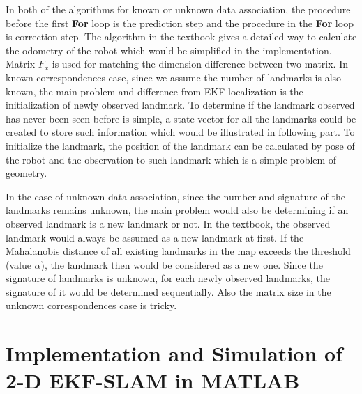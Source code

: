 \documentclass[conference]{IEEEtran}
\begin{document}
\par In both of the algorithms for known or unknown data association, the procedure before the first \textbf{For} loop is the prediction step and the procedure in the \textbf{For} loop is correction step. The algorithm in the textbook gives a detailed way to calculate the odometry of the robot which would be simplified in the implementation. Matrix $F_{x}$ is used for matching the dimension difference between two matrix. In known correspondences case, since we assume the number of landmarks is also known, the main problem and difference from EKF localization is the initialization of newly observed landmark. To determine if the landmark observed has never been seen before is simple, a state vector for all the landmarks could be created to store such information which would be illustrated in following part. To initialize the landmark, the position of the landmark can be calculated by pose of the robot and the observation to such landmark which is a simple problem of geometry.
\par In the case of unknown data association, since the number and signature of the landmarks remains unknown, the main problem would also be determining if an observed landmark is a new landmark or not. In the textbook, the observed landmark would always be assumed as a new landmark at first. If the Mahalanobis distance of all existing landmarks in the map exceeds the threshold (value $\alpha$), the landmark then would be considered as a new one. Since the signature of landmarks is unknown, for each newly observed landmarks, the signature of it would be determined sequentially. Also the matrix size in the unknown correspondences case is tricky.

\section{Implementation and Simulation of 2-D EKF-SLAM in MATLAB}
\end{document}
